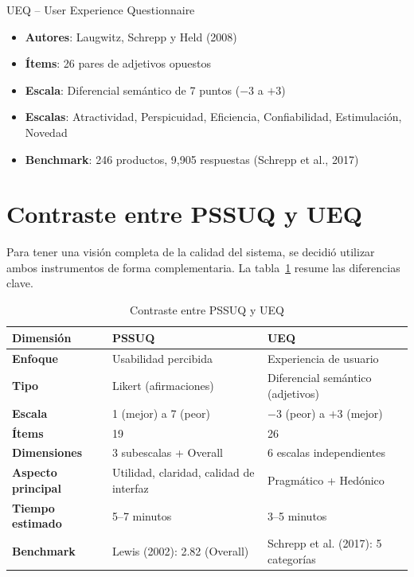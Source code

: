 \documentclass[a4paper,12pt]{report}
\begin{document}
\begin{definitionbox}{UEQ -- User Experience Questionnaire}
\begin{itemize}
    \item \textbf{Autores}: Laugwitz, Schrepp y Held (2008)
    \item \textbf{Ítems}: 26 pares de adjetivos opuestos
    \item \textbf{Escala}: Diferencial semántico de 7 puntos ($-3$ a $+3$)
    \item \textbf{Escalas}: Atractividad, Perspicuidad, Eficiencia, Confiabilidad, Estimulación, Novedad
    \item \textbf{Benchmark}: 246 productos, 9,905 respuestas (Schrepp et al., 2017)
\end{itemize}
\end{definitionbox}

\section{Contraste entre PSSUQ y UEQ}

Para tener una visión completa de la calidad del sistema, se decidió utilizar ambos instrumentos de forma complementaria. La tabla~\ref{tab:contraste_instrumentos} resume las diferencias clave.

\begin{table}[H]
    \centering
    \caption{Contraste entre PSSUQ y UEQ}
    \label{tab:contraste_instrumentos}
    \begin{tabular}{p{3.5cm} p{5cm} p{5cm}}
        \toprule
        \textbf{Dimensión} & \textbf{PSSUQ} & \textbf{UEQ} \\
        \midrule
        \textbf{Enfoque} & Usabilidad percibida & Experiencia de usuario \\
        \textbf{Tipo} & Likert (afirmaciones) & Diferencial semántico (adjetivos) \\
        \textbf{Escala} & 1 (mejor) a 7 (peor) & $-3$ (peor) a $+3$ (mejor) \\
        \textbf{Ítems} & 19 & 26 \\
        \textbf{Dimensiones} & 3 subescalas + Overall & 6 escalas independientes \\
        \textbf{Aspecto principal} & Utilidad, claridad, calidad de interfaz & Pragmático + Hedónico \\
        \textbf{Tiempo estimado} & 5--7 minutos & 3--5 minutos \\
        \textbf{Benchmark} & Lewis (2002): 2.82 (Overall) & Schrepp et al. (2017): 5 categorías \\
        \bottomrule
    \end{tabular}
\end{table}
\end{document}
